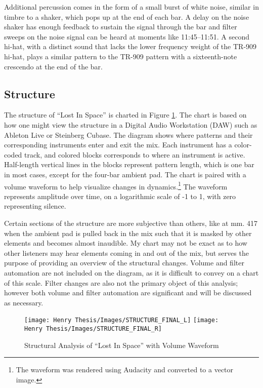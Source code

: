 \documentclass[12pt,twoside]{reedthesis}
\begin{document}
Additional percussion comes in the form of a small burst of white noise, similar in timbre to a shaker, which pops up at the end of each bar. A delay on the noise shaker has enough feedback to sustain the signal through the bar and filter sweeps on the noise signal can be heard at moments like 11:45--11:51. A second hi-hat, with a distinct sound that lacks the lower frequency weight of the TR-909 hi-hat, plays a similar pattern to the TR-909 pattern with a sixteenth-note crescendo at the end of the bar. 

\subsection{Structure}

The structure of ``Lost In Space'' is charted in Figure \ref{fig:structure}. The chart is based on how one might view the structure in a Digital Audio Workstation (DAW) such as Ableton Live or Steinberg Cubase. The diagram shows where patterns and their corresponding instruments enter and exit the mix. Each instrument has a color-coded track, and colored blocks corresponds to where an instrument is active. Half-length vertical lines in the blocks represent pattern length, which is one bar in most cases, except for the four-bar ambient pad. The chart is paired with a volume waveform to help visualize changes in dynamics.\footnote{The waveform was rendered using Audacity and converted to a vector image.} The waveform represents amplitude over time, on a logarithmic scale of -1 to 1, with zero representing silence.

Certain sections of the structure are more subjective than others, like at mm. 417 when the ambient pad is pulled back in the mix such that it is masked by other elements and becomes almost inaudible. My chart may not be exact as to how other listeners may hear elements coming in and out of the mix, but serves the purpose of providing an overview of the structural changes. Volume and filter automation are not included on the diagram, as it is difficult to convey on a chart of this scale. Filter changes are also not the primary object of this analysis; however both volume and filter automation are significant and will be discussed as necessary.

\begin{figure}
    \texttt{[image: Henry Thesis/Images/STRUCTURE\_FINAL\_L]}
    \texttt{[image: Henry Thesis/Images/STRUCTURE\_FINAL\_R]}
    \caption{Structural Analysis of ``Lost In Space'' with Volume Waveform}
    \label{fig:structure}
\end{figure}
\end{document}
